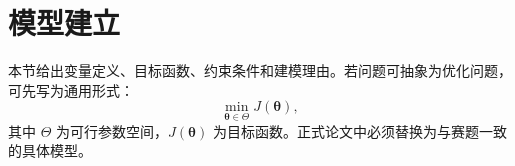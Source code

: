 \section{模型建立}

本节给出变量定义、目标函数、约束条件和建模理由。若问题可抽象为优化问题，可先写为通用形式：
\begin{equation}
  \min_{\bm{\theta} \in \Theta} J(\bm{\theta}),
  \label{eq:general-optimization}
\end{equation}
其中 $\Theta$ 为可行参数空间，$J(\bm{\theta})$ 为目标函数。正式论文中必须替换为与赛题一致的具体模型。

